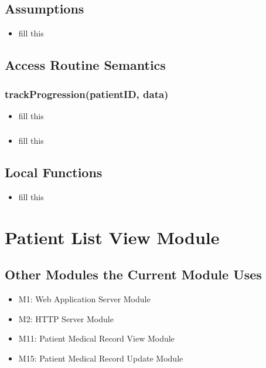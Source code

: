\documentclass[12pt, titlepage]{article}
\begin{document}
\subsection{Assumptions}
\begin{itemize}
    \item fill this
\end{itemize}

\subsection{Access Routine Semantics}
\subsubsection{trackProgression(patientID, data)}

\begin{itemize}
    \item fill this
\end{itemize}

\subsubsection{}

\begin{itemize}
    \item fill this
\end{itemize}


\subsection{Local Functions}
\begin{itemize}
    \item fill this
\end{itemize}
\section{Patient List View Module}

\subsection{Other Modules the Current Module Uses}
\begin{itemize}
    \item M1: Web Application Server Module
    \item M2: HTTP Server Module
    \item M11: Patient Medical Record View Module
    \item M15: Patient Medical Record Update Module
\end{itemize}
\end{document}
